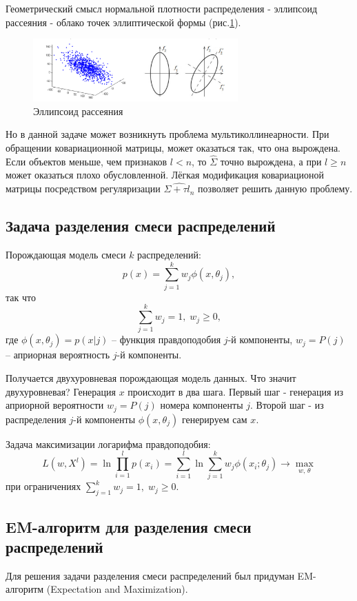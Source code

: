 Геометрический смысл нормальной плотности распределения - эллипсоид рассеяния - облако точек эллиптической формы (рис.\ref{ellips}). 

\begin{figure}[h!]
\begin{center}
\includegraphics[width=0.7\textwidth]{ellipsoid.png}
\caption{Эллипсоид рассеяния}
\label{ellips}
\end{center}
\end{figure}

Но в данной задаче может возникнуть проблема мультиколлинеарности. При обращении ковариационной матрицы, может оказаться так, что она вырождена. Если объектов меньше, чем признаков $l < n$, то $\hat{\Sigma}$ точно вырождена, а при $l \ge n$ может оказаться плохо обусловленной.
Лёгкая модификация ковариационой матрицы посредством регуляризации $\hat{\Sigma +\tau l_n}$ позволяет решить данную проблему. 

\subsection{Задача разделения смеси распределений}
Порождающая модель смеси $k$ распределений:
$$p(x) = \sum_{j=1}^k w_j \phi(x, \theta_j),$$ 
так что $$\sum_{j=1}^k w_j = 1, \; w_j \ge 0,$$
где $\phi(x,\theta_j) = p(x|j)$ -- функция правдоподобия $j$-й компоненты, $w_j = P(j)$ -- априорная вероятность $j$-й компоненты.

Получается двухуровневая порождающая модель данных. 
Что значит двухуровневая? Генерация $x$ происходит в два шага. Первый шаг - генерация из априорной вероятности $w_j = P(j)$ номера компоненты $j$. Второй шаг - из распределения $j$-й компоненты $\phi(x,\theta_j)$ генерируем сам $x$.

Задача максимизации логарифма правдоподобия:
$$L(w, X^l) = \ln \prod_{i=1}^l p(x_i) = \sum_{i=1}^l \ln \sum_{j=1}^k w_j\phi(x_i;\theta_j) \to \max_{w,\,\theta} $$ 
при ограничениях $\sum_{j=1}^k w_j = 1, \; w_j \ge 0$.

\subsection{EM-алгоритм для разделения смеси распределений}
Для решения задачи разделения смеси распределений был придуман EM-алгоритм (Expectation and Maximization). 

